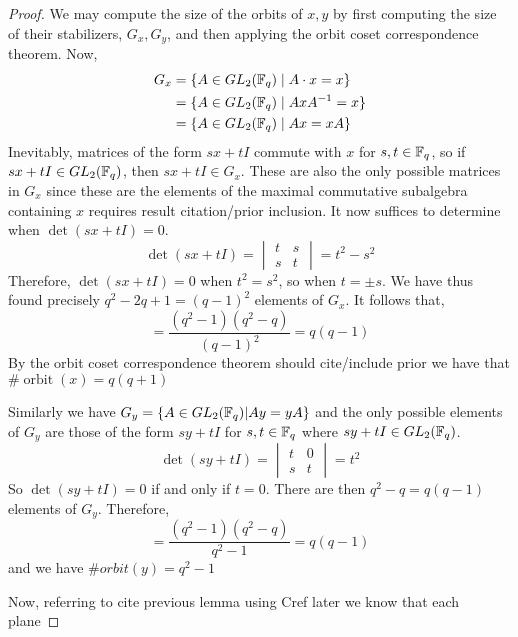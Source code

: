 \documentclass{amsart}
\begin{document}
\begin{proof}
    We may compute the size of the orbits of $x, y$ by first computing the size of their stabilizers, $G_x, G_y$, and then applying the orbit coset correspondence theorem.
    Now,
    \begin{align*}
        G_x &= \{A \in GL_2(\protect\mathbb{F}_q) \mid A \cdot x = x\} \\
            &= \{A \in GL_2(\protect\mathbb{F}_q) \mid AxA^{-1} = x\} \\
            &= \{A \in GL_2(\protect\mathbb{F}_q) \mid Ax = xA\} 
    \end{align*}
    Inevitably, matrices of the form $sx + tI$ commute with $x$ for $s,t \in \protect\mathbb{F}_q$, so if $sx + tI \in GL_2(\protect\mathbb{F}_q)$, then $sx + tI \in G_x$. These are also the only possible matrices in $G_x$ since these are the elements of the maximal commutative subalgebra containing $x$ {\color{blue} requires result citation/prior inclusion}. It now suffices to determine when $\det(sx + tI) = 0$.
    \begin{equation*}
        \det(sx+tI) =
        \begin{vmatrix}
            t & s \\
            s & t
        \end{vmatrix} = t^2 - s^2
    \end{equation*}
    Therefore, $\det(sx + tI) = 0$ when $t^2 = s^2$, so when $t = \pm s$. We have thus found precisely $q^2 - 2q + 1 = (q-1)^2$ elements of $G_x$. It follows that,
    \begin{equation*}
        [G:G_x] = \frac{(q^2-1)(q^2-q)}{(q-1)^2} = q(q-1)
    \end{equation*}
    By the orbit coset correspondence theorem {\color{blue} should cite/include prior} we have that $\#\operatorname{orbit}(x) = q(q + 1)$

    Similarly we have $G_y = \{A \in GL_2(\protect\mathbb{F}_q) | Ay = yA\}$ and the only possible elements of $G_y$ are those of the form $sy + tI$ for $s,t \in \protect\mathbb{F}_q$ where $sy+tI \in GL_2(\protect\mathbb{F}_q)$.
    \begin{equation*}
        \det(sy+tI) =
        \begin{vmatrix}
            t & 0 \\
            s & t
        \end{vmatrix} = t^2
    \end{equation*}
    So $\det(sy + tI) = 0$ if and only if $t = 0$. There are then $q^2 - q = q(q-1)$ elements of $G_y$. Therefore,
    \begin{equation*}
        [G:G_y] = \frac{(q^2-1)(q^2-q)}{q^2 - 1} = q(q-1)
    \end{equation*}
    and we have $\#orbit(y) = q^2 - 1$

    Now, referring to {\color{blue} cite previous lemma using Cref later} we know that each plane
\end{proof}
\end{document}
